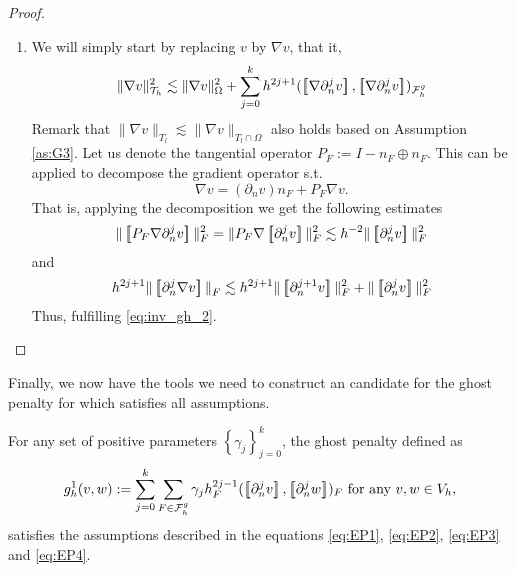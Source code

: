 \begin{proof}
\begin{enumerate}[label=\arabic*)]
    \item We will simply start by replacing $v$  by $\nabla v$, that it,
        \[
                    \| \nabla v \|_{ \mathcal{T} _{h} }^{2  } \lesssim \| \nabla v \|_{ \Omega  }^{ 2 }  + \sum_{j=0}^{k} h^{2j+1} ( \jump{ \nabla  \partial ^{j}_{n} v }, \jump{ \nabla  \partial ^{j}_{n} v}    )_{\mathcal{F}_{h}^{g}}
        \]
        Remark that $\|  \nabla v \|_{ T_{l} }^{  } \lesssim  \|  \nabla v \|_{ T_{l} \cap \Omega  }^{  }  $ also holds based on Assumption \ref{as:G3}.
        Let us denote the tangential operator $P_{F} := I - n_{F} \oplus n_{F} $. This can be applied to decompose the gradient operator s.t. \[
        \nabla v = ( \partial _{n}v)n_{F} + P_{F} \nabla v.
        \]
        That is, applying the decomposition we get the following estimates \[
        \| \jump{ P_{F}   \nabla \partial _{n}^{j} v }\|_{ F }^{ 2 } = \| P_{F} \nabla \jump{ \partial _{n}^{j} v }   \|_{ F  }^{ 2} \lesssim h^{-2} \|  \jump{ \partial ^{j}_{n} v }   \|_{ F }^{  2}
        \]
        and \[
            h^{2j +1} \| \jump{\partial ^{j}_{n} \nabla v}  \|_{ F }^{  } \lesssim h^{2j +1 } \| \jump{ \partial ^{j+1}_{n} v }   \|_{F  }^{ 2 } + \| \jump{ \partial ^{j}_{n}v }   \|_{ F }^{ 2 }
        \]
        Thus, fulfilling \eqref{eq:inv_gh_2}.

    \end{enumerate}


\end{proof}



Finally, we now have the tools we need to construct an candidate for the ghost penalty for which satisfies all assumptions.

\begin{proposition}
    For any set of positive parameters $\left\{ \gamma _{j} \right\} _{j=0}^{k}$, the ghost penalty defined as \[
    g^{1}_{h}( v,w)  := \sum_{j=0}^{k} \sum_{F \in \mathcal{F} _{h}^{g}}^{} \gamma _{j} h^{2j-1}_{F} ( \jump{ \partial ^{j}_{n} v }, \jump{ \partial ^{j}_{n} w }  ) _{F} \text{ for any } v,w \in V_{h},
    \]
    satisfies the assumptions described in the equations \eqref{eq:EP1}, \eqref{eq:EP2}, \eqref{eq:EP3} and \eqref{eq:EP4}.
\end{proposition}


